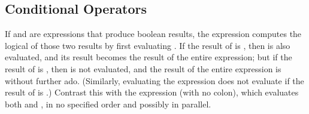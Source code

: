 \subsection{Conditional Operators}

If  and  are expressions that produce
boolean results, the expression  computes the
logical  of those two results by first evaluating .
If the result of  is , then  is also
evaluated, and its
result becomes the result of the entire expression; but if the result
of  is , then  is not evaluated,
and the result of the entire expression is  without further ado.
(Similarly, evaluating the expression  does not
evaluate  if the result of  is .)
Contrast this with the expression  (with no colon),
which evaluates both  and , in no specified order and
possibly in parallel.
